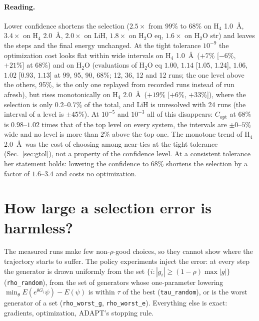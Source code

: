 \documentclass[11pt]{article}
\newcommand{\Copt}{C_{\mathrm{opt}}}
\begin{document}
\paragraph{Reading.} Lower confidence shortens the selection ($2.5\times$ from 99\% to 68\% on H$_4$ 1.0~\AA, $3.4\times$ on H$_4$ 2.0~\AA, $2.0\times$ on LiH, $1.8\times$ on H$_2$O eq, $1.6\times$ on H$_2$O str) and leaves the steps and the final energy unchanged. At the tight tolerance $10^{-9}$ the optimization cost looks flat within wide intervals on H$_4$ 1.0~\AA\ ($+7\%$ [$-6\%$, $+21\%$] at 68\%) and on H$_2$O (evaluations of H$_2$O eq $1.00$, $1.14$ [$1.05$, $1.24$], $1.06$, $1.02$ [$0.93$, $1.13$] at 99, 95, 90, 68\%; 12, 36, 12 and 12 runs; the one level above the others, 95\%, is the only one replayed from recorded runs instead of run afresh),
but rises monotonically on H$_4$ 2.0~\AA\ ($+19\%$ [$+6\%$, $+33\%$]), where the selection is only $0.2$--$0.7\%$ of the total, and LiH is unresolved with 24 runs (the interval of a level is $\pm45\%$). At $10^{-5}$ and $10^{-3}$ all of this disappears: $\Copt$ at 68\% is $0.98$--$1.02$ times that of the top level on every system, the intervals are $\pm0$--$5\%$ wide and no level is more than $2\%$ above the top one.
The monotone trend of H$_4$ 2.0~\AA\ was the cost of choosing among near-ties at the tight tolerance (Sec.~\ref{sec:gtol}), not a property of the confidence level. At a consistent tolerance her statement holds: lowering the confidence to 68\% shortens the selection by a factor of $1.6$--$3.4$ and costs no optimization.

\section{How large a selection error is harmless?}\label{sec:dose}

The measured runs make few non-$\rho$-good choices, so they cannot show where the trajectory starts to suffer. The policy experiments inject the error: at every step the generator is drawn uniformly from the set
$\{i:|g_i|\ge(1-\rho)\max|g|\}$ (\texttt{rho\_random}), from the set of generators whose one-parameter lowering $\min_\theta E(e^{\theta G_i}\psi)-E(\psi)$ is within $\tau$ of the best (\texttt{tau\_random}), or is the worst generator of a set (\texttt{rho\_worst\_g}, \texttt{rho\_worst\_e}).
Everything else is exact: gradients, optimization, ADAPT's stopping rule.
\end{document}
